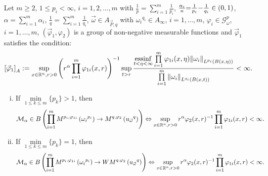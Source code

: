 \documentclass[11pt, twoside, leqno]{article}
\begin{document}
\begin{thm}\label{SCFRM}
	Let $m\geq 2$, $1\leq p_i<\infty$, $i=1,2,\ldots,m$ with $\frac{1}{p} = \sum\limits_{i = 1}^m {\frac{1}{{{p_i}}}}$,  $\frac{{{\alpha _i}}}{n}{\rm{ = }}\frac{1}{{{p_i}}}{\rm{ - }}\frac{1}{{{q_i}}} \in (0,1)$, $\alpha  = \sum\limits_{i = 1}^m {{\alpha _i}}$, $\frac{1}{q} = \sum\limits_{i = 1}^m {\frac{1}{{{q_i}}}}$, $\vec{\omega} \in {A_{\vec P,q}}$ with ${\omega _i}^{{q_i}} \in {A_\infty }$, $i = 1, \ldots ,m$, ${\varphi _i} \in \mathcal{G}_\omega ^p$, $i = 1, \ldots ,m$, $({{\vec \varphi }_1},{\varphi _2})$ is a group of non-negative measurable functions and ${{\vec \varphi }_1}$ satisfies the condition:
	\begin{equation}\label{cen1}
	{\left[ {{{\vec \varphi }_1}} \right]_A}: = \mathop {\sup }\limits_{x \in {{\mathbb R^n}},r > 0} {\left( {{r^\alpha }\prod\limits_{i = 1}^m {{\varphi _{1i}}(x,r)} } \right)^{{\rm{ - }}1}}\mathop {\sup }\limits_{t > r} \frac{{\mathop {{\rm{essinf}}}\limits_{t < \eta  < \infty } \prod\limits_{i = 1}^m {{\varphi _{1i}}(x,\eta ){{\left\| {{\omega _i}} \right\|}_{{L^{{p_i}}}(B(x,\eta ))}}} }}{{\prod\limits_{i = 1}^m {{{\left\| {{\omega _i}} \right\|}_{{L^{{q_i}}}(B(x,t))}}} }} < \infty.
	\end{equation}
	\begin{enumerate}[(i)]
		\item If $\mathop {\min }\limits_{1 \le k \le m} \{ {p_k}\}  > 1$, then
		\begin{equation*}
		{{\mathcal M}_\alpha } \in B\left( {\prod\limits_{i = 1}^m {{M^{{p_i},{\varphi _{1i}}}}\left( {{\omega _i}^{{p_i}}} \right)}  \to {M^{q,{\varphi _2}}}\left( {{u_{\vec \omega }}^q} \right)} \right) \Leftrightarrow \mathop {\sup }\limits_{x \in {{\mathbb R^n}},r > 0} {r^\alpha }{\varphi _2}{(x,r)^{ - 1}}\prod\limits_{i = 1}^m {{\varphi _{1i}}(x,r)}  < \infty.
		\end{equation*}
		\item If $\mathop {\min }\limits_{1 \le k \le m} \{ {p_k}\}  = 1$, then 		\begin{equation*}
		{{\mathcal M}_\alpha } \in B\left( {\prod\limits_{i = 1}^m {{M^{{p_i},{\varphi _{1i}}}}\left( {{\omega _i}^{{p_i}}} \right)}  \to {WM^{q,{\varphi _2}}}\left( {{u_{\vec \omega }}^q} \right)} \right) \Leftrightarrow \mathop {\sup }\limits_{x \in {{\mathbb R^n}},r > 0} {r^\alpha }{\varphi _2}{(x,r)^{ - 1}}\prod\limits_{i = 1}^m {{\varphi _{1i}}(x,r)}  < \infty.
		\end{equation*}
	\end{enumerate}
\end{thm}
\end{document}
